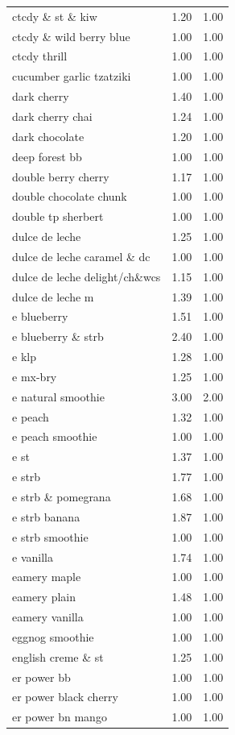 \begin{table}
\begin{tabular}{lrr}
ctcdy \& st \& kiw & 1.20 & 1.00 \\
ctcdy \& wild berry blue & 1.00 & 1.00 \\
ctcdy thrill & 1.00 & 1.00 \\
cucumber garlic tzatziki & 1.00 & 1.00 \\
dark cherry & 1.40 & 1.00 \\
dark cherry chai & 1.24 & 1.00 \\
dark chocolate & 1.20 & 1.00 \\
deep forest bb & 1.00 & 1.00 \\
double berry cherry & 1.17 & 1.00 \\
double chocolate chunk & 1.00 & 1.00 \\
double tp sherbert & 1.00 & 1.00 \\
dulce de leche & 1.25 & 1.00 \\
dulce de leche caramel \& dc & 1.00 & 1.00 \\
dulce de leche delight/ch\&wcs & 1.15 & 1.00 \\
dulce de leche m & 1.39 & 1.00 \\
e blueberry & 1.51 & 1.00 \\
e blueberry \& strb & 2.40 & 1.00 \\
e klp & 1.28 & 1.00 \\
e mx-bry & 1.25 & 1.00 \\
e natural smoothie & 3.00 & 2.00 \\
e peach & 1.32 & 1.00 \\
e peach smoothie & 1.00 & 1.00 \\
e st & 1.37 & 1.00 \\
e strb & 1.77 & 1.00 \\
e strb \& pomegrana & 1.68 & 1.00 \\
e strb banana & 1.87 & 1.00 \\
e strb smoothie & 1.00 & 1.00 \\
e vanilla & 1.74 & 1.00 \\
eamery maple & 1.00 & 1.00 \\
eamery plain & 1.48 & 1.00 \\
eamery vanilla & 1.00 & 1.00 \\
eggnog smoothie & 1.00 & 1.00 \\
english creme \& st & 1.25 & 1.00 \\
er power bb & 1.00 & 1.00 \\
er power black cherry & 1.00 & 1.00 \\
er power bn mango & 1.00 & 1.00 \\

\end{tabular}
\end{table}

